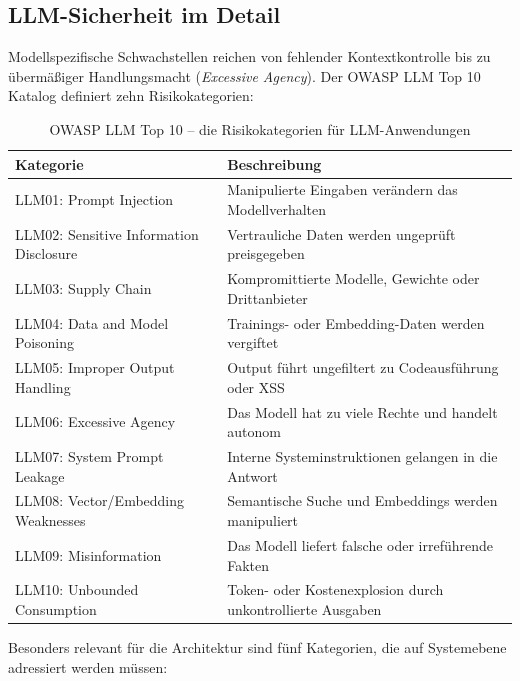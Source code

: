 \subsection{LLM-Sicherheit im Detail}

Modellspezifische Schwachstellen reichen von fehlender Kontextkontrolle bis zu übermäßiger Handlungsmacht (\textit{Excessive Agency}). Der OWASP LLM Top 10 Katalog definiert zehn Risikokategorien:

\begin{table}[H]
\centering
\begin{tabularx}{\linewidth}{lX}
\toprule
\textbf{Kategorie} & \textbf{Beschreibung} \\
\midrule
LLM01: Prompt Injection & Manipulierte Eingaben verändern das Modellverhalten \\
LLM02: Sensitive Information Disclosure & Vertrauliche Daten werden ungeprüft preisgegeben \\
LLM03: Supply Chain & Kompromittierte Modelle, Gewichte oder Drittanbieter \\
LLM04: Data and Model Poisoning & Trainings- oder Embedding-Daten werden vergiftet \\
LLM05: Improper Output Handling & Output führt ungefiltert zu Codeausführung oder XSS \\
LLM06: Excessive Agency & Das Modell hat zu viele Rechte und handelt autonom \\
LLM07: System Prompt Leakage & Interne Systeminstruktionen gelangen in die Antwort \\
LLM08: Vector/Embedding Weaknesses & Semantische Suche und Embeddings werden manipuliert \\
LLM09: Misinformation & Das Modell liefert falsche oder irreführende Fakten \\
LLM10: Unbounded Consumption & Token- oder Kostenexplosion durch unkontrollierte Ausgaben \\
\bottomrule
\end{tabularx}
\caption{OWASP LLM Top 10 -- die Risikokategorien für LLM-Anwendungen}
\end{table}

Besonders relevant für die Architektur sind fünf Kategorien, die auf Systemebene adressiert werden müssen:

